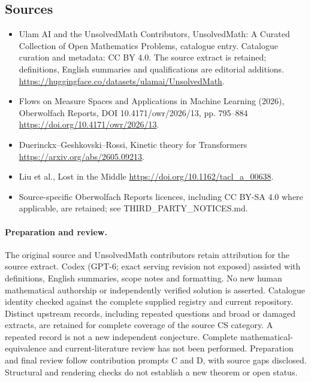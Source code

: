 \documentclass[11pt]{article}
\begin{document}
\subsection{Sources}
\begin{itemize}
\item[\hypertarget{source:statement:1}{S1}] Ulam AI and the UnsolvedMath Contributors, UnsolvedMath: A Curated Collection of Open Mathematics Problems, catalogue entry. Catalogue curation and metadata: CC BY 4.0. The source extract is retained; definitions, English summaries and qualifications are editorial additions.
\url{https://huggingface.co/datasets/ulamai/UnsolvedMath}.
\item[\hypertarget{source:statement:2}{S2}] Flows on Measure Spaces and Applications in Machine Learning (2026), Oberwolfach Reports, DOI 10.4171/owr/2026/13, pp. 795--884
\url{https://doi.org/10.4171/owr/2026/13}.
\item[\hypertarget{source:statement:3}{S3}] Duerinckx--Geshkovski--Rossi, Kinetic theory for Transformers
\url{https://arxiv.org/abs/2605.09213}.
\item[\hypertarget{source:statement:4}{S4}] Liu et al., Lost in the Middle
\url{https://doi.org/10.1162/tacl_a_00638}.
\item Source-specific Oberwolfach Reports licences, including CC BY-SA 4.0 where applicable, are retained; see THIRD\_PARTY\_NOTICES.md.
\end{itemize}
\paragraph{Preparation and review.}
The original source and UnsolvedMath contributors retain attribution for the source extract. Codex (GPT-6; exact serving revision not exposed) assisted with definitions, English summaries, scope notes and formatting. No new human mathematical authorship or independently verified solution is asserted. Catalogue identity checked against the complete supplied registry and current repository. Distinct upstream records, including repeated questions and broad or damaged extracts, are retained for complete coverage of the source CS category. A repeated record is not a new independent conjecture. Complete mathematical-equivalence and current-literature review has not been performed. Preparation and final review follow contribution prompts C and D, with source gaps disclosed. Structural and rendering checks do not establish a new theorem or open status.
\label{end:statement}
\end{document}
